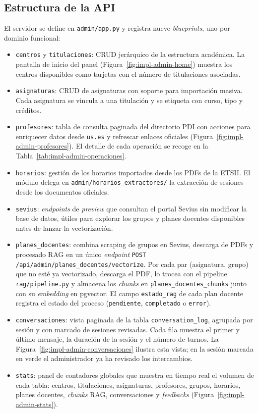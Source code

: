 \subsection{Estructura de la API}

El servidor se define en \texttt{admin/app.py} y registra nueve \textit{blueprints}, uno por dominio funcional:

\begin{itemize}
    \item \texttt{centros} y \texttt{titulaciones}: CRUD jerárquico de la estructura académica. La pantalla de inicio del panel (Figura~\ref{fig:impl-admin-home}) muestra los centros disponibles como tarjetas con el número de titulaciones asociadas.
    \item \texttt{asignaturas}: CRUD de asignaturas con soporte para importación masiva. Cada asignatura se vincula a una titulación y se etiqueta con curso, tipo y créditos.
    \item \texttt{profesores}: tabla de consulta paginada del directorio PDI con acciones para enriquecer datos desde \texttt{us.es} y refrescar enlaces oficiales (Figura~\ref{fig:impl-admin-profesores}). El detalle de cada operación se recoge en la Tabla~\ref{tab:impl-admin-operaciones}.
    \item \texttt{horarios}: gestión de los horarios importados desde los PDFs de la ETSII. El módulo delega en \texttt{admin/horarios\_extractores/} la extracción de sesiones desde los documentos oficiales.
    \item \texttt{sevius}: \textit{endpoints} de \textit{preview} que consultan el portal Sevius sin modificar la base de datos, útiles para explorar los grupos y planes docentes disponibles antes de lanzar la vectorización.
    \item \texttt{planes\_docentes}: combina scraping de grupos en Sevius, descarga de PDFs y procesado RAG en un único \textit{endpoint} \texttt{POST /api/admin/planes\_docentes/vectorize}. Por cada par (asignatura, grupo) que no esté ya vectorizado, descarga el PDF, lo trocea con el pipeline \texttt{rag/pipeline.py} y almacena los \textit{chunks} en \texttt{planes\_docentes\_chunks} junto con su \textit{embedding} en pgvector. El campo \texttt{estado\_rag} de cada plan docente registra el estado del proceso (\texttt{pendiente}, \texttt{completado} o \texttt{error}).
    \item \texttt{conversaciones}: vista paginada de la tabla \texttt{conversation\_log}, agrupada por sesión y con marcado de sesiones revisadas. Cada fila muestra el primer y último mensaje, la duración de la sesión y el número de turnos. La Figura~\ref{fig:impl-admin-conversaciones} ilustra esta vista; en la sesión marcada en verde el administrador ya ha revisado los intercambios.
    \item \texttt{stats}: panel de contadores globales que muestra en tiempo real el volumen de cada tabla: centros, titulaciones, asignaturas, profesores, grupos, horarios, planes docentes, \textit{chunks} RAG, conversaciones y \textit{feedbacks} (Figura~\ref{fig:impl-admin-stats}).
\end{itemize}

